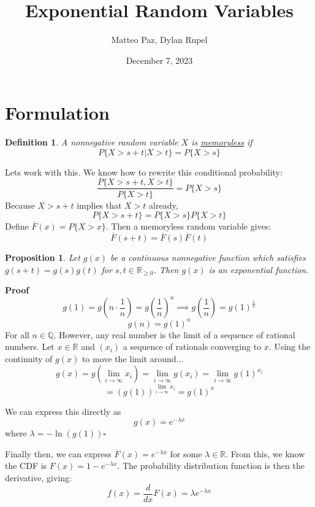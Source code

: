 \documentclass{article}
\author{Matteo Paz, Dylan Rupel}
\date{December 7, 2023}
\title{Exponential Random Variables}
\newtheorem{Def}{Definition}
\newtheorem{Proof}{Proposition}
\begin{document}
\maketitle

\section{Formulation}
\begin{Def}
A nonnegative random variable $X$ is \underline{memoryless} if
\[P\{X > s+t | X > t\} = P \{X > s\}\]
\end{Def}

Lets work with this. We know how to rewrite this conditional probability:
\[\frac{P\{X > s + t, X > t\}} {P\{X > t\}} = P\{X > s\}\]
Because $X> s+t$ implies that $X>t$ already,
\[P\{X > s+t\} = P\{X>s\}P\{X>t\}\]
Define $\overline{F}(x) = P\{X > x\}$. Then a memoryless random variable gives:
\[\overline{F}(s+t) = \overline{F}(s) \overline{F}(t)\]
\begin{Proof}
Let $g(x)$ be a continuous nonnegative function which satisfies $g(s+t) = g(s)g(t)$ for $s,t \in \mathbb{R}_{\geq 0}$.
Then $g(x)$ is an exponential function.
\end{Proof}
\textbf{Proof} \\
\[g(1) = g\left(n \cdot \frac{1}{n}\right) = g\left(\frac{1}{n}\right)^n \implies g\left(\frac{1}{n}\right) = g(1)^\frac{1}{n}\]
\[g(n) = g(1)^n\]
For all $n \in \mathbb{Q}$. However, any real number is the limit of a sequence of rational numbers.
Let $x \in \mathbb{R}$ and $(x_i)$ a sequence of rationals converging to $x$. Using the continuity of $g(x)$ to move the limit around...
\[g(x) = g\left(\lim_{i\to\infty} x_i\right) =\lim_{i\to\infty} g(x_i) = \lim_{i\to\infty} g(1)^{x_i} \]
\[= \left(g(1)\right)^{\lim_{i\to\infty} x_i} = g(1)^x\]

We can express this directly as 
\[g(x) = e^{-\lambda x}\]
where $\lambda = -\ln(g(1)) \square$
\vspace{4em}

Finally then, we can express $\overline{F}(x) = e^{-\lambda x}$ for some $\lambda \in \mathbb{R}$.
From this, we know the CDF is $F(x) = 1-e^{-\lambda x}$. The probability distribution function is then the derivative, giving:
\[f(x) = \frac{d}{dx} F(x) = \lambda e^{-\lambda x}\]
\end{document}

